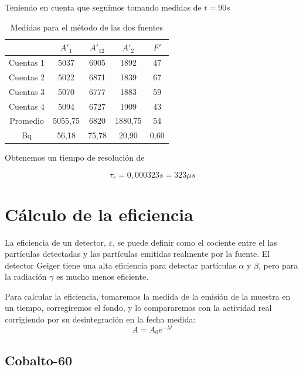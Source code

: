 \documentclass[a4paper,12pt,spanish]{article}
\begin{document}
	
	Teniendo en cuenta que seguimos tomando medidas de $t = 90\si{s}$
	
	\begin{table}[H]
		\centering
		\begin{tabular}{c|c|c|c|c|}
			\cline{2-5}
			& $A'_1$  & $A'_12$ & $A'_2$  & $F'$ \\ \hline
			\multicolumn{1}{|c|}{Cuentas 1} & 5037    & 6905    & 1892    & 47    \\ \hline
			\multicolumn{1}{|c|}{Cuentas 2} & 5022    & 6871    & 1839    & 67    \\ \hline
			\multicolumn{1}{|c|}{Cuentas 3} & 5070    & 6777    & 1883    & 59    \\ \hline
			\multicolumn{1}{|c|}{Cuentas 4} & 5094    & 6727    & 1909    & 43    \\ \hline\hline
			\multicolumn{1}{|c|}{Promedio}  & 5055,75 & 6820    & 1880,75 & 54    \\ \hline\hline
			\multicolumn{1}{|c|}{Bq}        & 56,18   & 75,78   & 20,90   & 0,60  \\ \hline
		\end{tabular}
		\caption{Medidas para el método de las dos fuentes}
		\label{tab:my-table}
	\end{table}
	
	
	Obtenemos un tiempo de resolución de
	
	\[ \tau_r = 0,000323 s = 323\si{\mu s}
	\]
	
	\section{Cálculo de la eficiencia}
	
	La eficiencia de un detector, $\varepsilon$, se puede definir como el cociente entre el las partículas detectadas y las partículas emitidas realmente por la fuente. El detector Geiger tiene una alta eficiencia  para detectar partículas $\alpha$ y $\beta$, pero para la radiación $\gamma$ es mucho menos eficiente.
	
	
	Para calcular la eficiencia, tomaremos la medida de la emisión de la muestra en un tiempo, corregiremos el fondo, y lo compararemos con la actividad real corrigiendo por su desintegración en la fecha medida:
	\[ A = A_0  e^{-\lambda t}
	\]
	
	
	
	
	
	
	
	
	\subsection*{Cobalto-60} %
	
\end{document}

